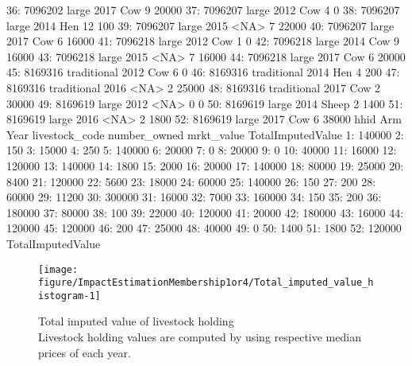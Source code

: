 \begin{Schunk}
\begin{Soutput}
36: 7096202       large 2017            Cow            9      20000
37: 7096207       large 2012            Cow            4          0
38: 7096207       large 2014            Hen           12        100
39: 7096207       large 2015           <NA>            7      22000
40: 7096207       large 2017            Cow            6      16000
41: 7096218       large 2012            Cow            1          0
42: 7096218       large 2014            Cow            9      16000
43: 7096218       large 2015           <NA>            7      16000
44: 7096218       large 2017            Cow            6      20000
45: 8169316 traditional 2012            Cow            6          0
46: 8169316 traditional 2014            Hen            4        200
47: 8169316 traditional 2016           <NA>            2      25000
48: 8169316 traditional 2017            Cow            2      30000
49: 8169619       large 2012           <NA>            0          0
50: 8169619       large 2014          Sheep            2       1400
51: 8169619       large 2016           <NA>            2       1800
52: 8169619       large 2017            Cow            6      38000
       hhid         Arm Year livestock_code number_owned mrkt_value
    TotalImputedValue
 1:            140000
 2:               150
 3:             15000
 4:               250
 5:            140000
 6:             20000
 7:                 0
 8:             20000
 9:                 0
10:             40000
11:             16000
12:            120000
13:            140000
14:              1800
15:              2000
16:             20000
17:            140000
18:             80000
19:             25000
20:              8400
21:            120000
22:              5600
23:             18000
24:             60000
25:            140000
26:               150
27:               200
28:             60000
29:             11200
30:            300000
31:             16000
32:              7000
33:            160000
34:               150
35:               200
36:            180000
37:             80000
38:               100
39:             22000
40:            120000
41:             20000
42:            180000
43:             16000
44:            120000
45:            120000
46:               200
47:             25000
48:             40000
49:                 0
50:              1400
51:              1800
52:            120000
    TotalImputedValue
\end{Soutput}
\end{Schunk}
\begin{Schunk}
\begin{figure}

{\centering \texttt{[image: figure/ImpactEstimationMembership1or4/Total\_imputed\_value\_histogram-1]} 

}

\caption{Total imputed value of livestock holding\\ {\footnotesize Livestock holding values are computed by using respective median prices of each year.\setlength{\baselineskip}{8pt}}}\label{Figure Total imputed value histogram}
\end{figure}
\end{Schunk}
